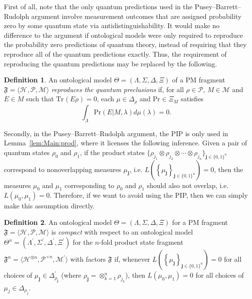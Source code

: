 \documentclass[DIV=calc,fontsize=12pt]{scrartcl} %
\theoremstyle{definition}
\newtheorem{definition}{Definition}[section]
\theoremstyle{plain}
\newcommand{\Hilb}[1][]{\ensuremath{\mathcal{H}_{#1}}}
\newcommand{\Tr}[2][]{\ensuremath{\text{Tr}_{#1} \left ( #2 \right )}}
\begin{document}
First of all, note that the only quantum predictions used in the Pusey--Barrett--Rudolph
argument involve measurement outcomes that are assigned probability
zero by some quantum state via antidistinguishability.  It would make
no difference to the argument if ontological models were only required
to reproduce the probability zero predictions of quantum theory,
instead of requiring that they reproduce all of the quantum
predictions exactly.  Thus, the requirement of reproducing the quantum
predictions may be replaced by the following.

\begin{definition}
An ontological model $\Theta = (\Lambda, \Sigma, \Delta, \Xi)$ of a
PM fragment $\mathfrak{F} = \langle \Hilb, \mathcal{P}, \mathcal{M}
\rangle$ \emph{reproduces the quantum preclusions} if, for all $\rho
\in \mathcal{P}$, $M \in \mathcal{M}$ and $E \in M$ such that $\Tr{E
\rho} = 0$, each $\mu \in \Delta_{\rho}$ and $\text{Pr} \in \Xi_M$
satisfies
\begin{equation}
\int_{\Lambda} \text{Pr}(E|M,\lambda) d \mu(\lambda) = 0.
\end{equation}
\end{definition}

Secondly, in the Pusey--Barrett--Rudolph argument, the PIP is only used in
Lemma~\ref{lem:Main:prod}, where it licenses the following inference.
Given a pair of quantum states $\rho_0$ and $\rho_1$, if the product
states $\{\rho_{j_1} \otimes \rho_{j_2} \otimes \cdots \otimes
\rho_{j_n}\}_{\bm{j} \in \{0,1\}^n}$ correspond to nonoverlapping
measures $\mu_{\bm{j}}$, i.e. $L \left ( \left \{ \mu_{\bm{j}}\right
\}_{\bm{j} \in \{0,1\}^n} \right ) = 0$, then the measures $\mu_0$
and $\mu_1$ corresponding to $\rho_0$ and $\rho_1$ should also not
overlap, i.e. $L(\mu_0,\mu_1) = 0$.  Therefore, if we want to avoid
using the PIP, then we can simply make this assumption directly.

\begin{definition}
An ontological model $\Theta = (\Lambda, \Sigma, \Delta, \Xi)$ for a
PM fragment $\mathfrak{F} = \langle \Hilb, \mathcal{P}, \mathcal{M}
\rangle $ is \emph{compact} with respect to an ontological model
$\Theta^n = (\Lambda^{\prime}, \Sigma^{\prime}, \Delta^{\prime},
\Xi^{\prime})$ for the $n$-fold product state fragment
$\mathfrak{F}^n = \langle \Hilb^{\otimes n}, \mathcal{P}^{\times n},
\mathcal{M}^{\prime} \rangle$ with factors $\mathfrak{F}$ if,
whenever $L \left ( \left \{ \mu_{\bm{j}} \right \}_{\bm{j} \in
\{0,1\}^n} \right ) = 0$ for all choices of $\mu_{\bm{j}} \in
\Delta^{\prime}_{\rho_{\bm{j}}}$ (where $\rho_{\bm{j}} =
\otimes_{k=1}^n \rho_{j_k}$), then $L(\mu_0,\mu_1) = 0$ for all
choices of $\mu_j \in \Delta_{\rho_j}$.
\end{definition}
\end{document}
